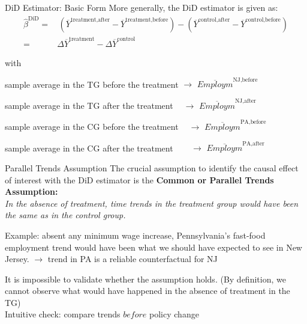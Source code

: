 \documentclass[9pt,aspectratio=169]{beamer}
\let\svdescription\description
\let\svenddescription\enddescription
\renewenvironment{description}{%
  \svdescription%
  \let\svitem\item%
  \renewcommand\item[1][]{\svitem[\textcolor{\descriptioncolor}{##1}]}%
  }{
  \svenddescription%
  }
\newcommand\descriptioncolor{teal}
\begin{document}
\begin{frame}{DiD Estimator: Basic Form}
More generally, the DiD estimator is given as:
\begin{align*}
  \widehat{\beta}^{\text{DiD}} =& \, (\overline{Y}^{\text{treatment,after}} - \overline{Y}^{\text{treatment,before}}) - (\overline{Y}^{\text{control,after}} - \overline{Y}^{\text{control,before}}) \\
  =& \Delta \overline{Y}^{\text{treatment}} - \Delta \overline{Y}^{\text{control}} 
\end{align*}

with
\begin{description}
\item[$\overline{Y}^{\text{treatment,before}}$] sample average in the TG before the treatment \color{gray} $\rightarrow$ $\overline{Employm}^{\text{NJ,before}}$
\item[$\overline{Y}^{\text{treatment,after}}$] \color{black} sample average in the TG after the treatment \color{gray}
$\: \: \: \: \rightarrow$ $\overline{Employm}^{\text{NJ,after}}$
\item[$\overline{Y}^{\text{control,before}}$] \color{black} sample average in the CG before the treatment \color{gray} $\: \: \: \:  \rightarrow$ $\overline{Employm}^{\text{PA,before}}$
\item[$\overline{Y}^{\text{control,after}}$] \color{black} sample average in the CG after the treatment \color{gray} $\: \: \: \: \: \: \: \: \rightarrow$ $ \overline{Employm}^{\text{PA,after}}$
\end{description}
\end{frame}


\begin{frame}{Parallel Trends Assumption}
The crucial assumption to identify the causal effect of interest with the DiD estimator is the \alert{\textbf{Common or Parallel Trends Assumption:}}
\\
\textit{In the absence of treatment, time trends in the treatment group would have been the same as in the control group.}

\pause

Example: absent any minimum wage increase, Pennsylvania's fast-food employment trend would have been what we should have expected to see in New Jersey. $\rightarrow$ trend in PA is a reliable counterfactual for NJ

\pause

It is impossible to validate whether the assumption holds. (By definition, we cannot observe what would have happened in the absence of treatment in the TG) \\
Intuitive check: compare trends $before$ policy change

\end{frame}
\end{document}
